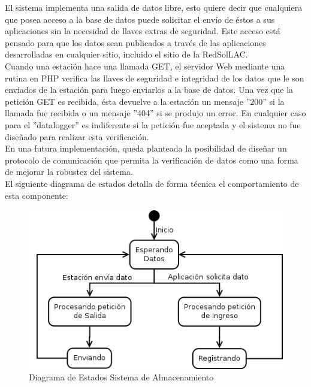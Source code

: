 El sistema implementa una salida de datos libre, esto quiere decir que cualquiera que posea acceso a la base de datos puede solicitar el envío de éstos a sus aplicaciones sin la necesidad de llaves extras de seguridad. Este acceso está pensado para que los datos sean publicados a través de las aplicaciones desarrolladas en cualquier sitio, incluido el sitio de la RedSolLAC.\\

Cuando una estación hace una llamada GET, el servidor Web mediante una rutina en PHP verifica las llaves de seguridad e integridad de los datos que le son enviados de la estación para luego enviarlos a la base de datos. Una vez que la petición GET es recibida, ésta devuelve a la estación un mensaje ''200'' si la llamada fue recibida o un mensaje ''404'' si se produjo un error. En cualquier caso para el ''datalogger'' es indiferente si la petición fue aceptada y el sistema no fue diseñado para realizar esta verificación.\\ En una futura implementación, queda planteada la posibilidad de diseñar un protocolo de comunicación que permita la verificación de datos como una forma de mejorar la robustez del sistema.\\

El siguiente diagrama de estados detalla de forma técnica el comportamiento de esta componente:
\begin{figure}[h!]
        \centering
        \includegraphics[scale=0.6]{images/datosEstados}
        \caption{Diagrama de Estados Sistema de Almacenamiento}
        \label{almacenamientoSecuencia}
\end{figure}

